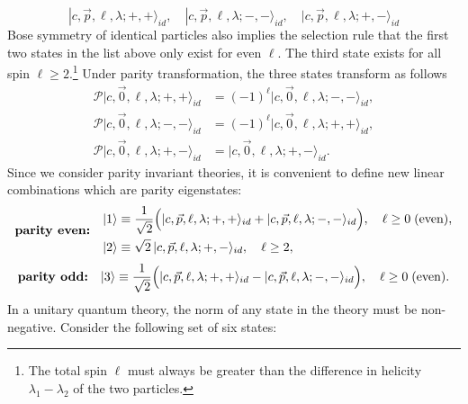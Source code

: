 \begin{equation}
	|c,\vec p, \ell, \lambda; + , + \rangle_{id}, \quad |c,\vec p, \ell, \lambda; - , - \rangle_{id}, \quad |c,\vec p, \ell, \lambda; + , - \rangle_{id}
\end{equation}
Bose symmetry of identical particles also implies the selection rule that the first two states in the list above only exist for even $\ell$. The third state exists for all spin $\ell \geq 2$.\footnote{The total spin $\ell$ must always be greater than the difference in helicity $\lambda_1 - \lambda_2$ of the two particles.} Under parity transformation, the three states transform as follows 
\begin{equation}
	\begin{aligned}
		\mathcal P|c,\vec 0, \ell, \lambda; + , + \rangle_{id} &= (-1)^{\ell} |c,\vec 0, \ell, \lambda; - , - \rangle_{id},\\
		\mathcal P|c,\vec 0, \ell, \lambda; - , - \rangle_{id} &= (-1)^{\ell} |c,\vec 0, \ell, \lambda; + , + \rangle_{id},\\
		\mathcal P|c,\vec 0, \ell, \lambda; + , - \rangle_{id} &=  |c,\vec 0, \ell, \lambda; + , - \rangle_{id}.
	\end{aligned}
	\label{parityOnPartialWaves}
\end{equation}
Since we consider parity invariant theories, it is convenient to define new linear combinations which are parity eigenstates:
\begin{equation}
	\label{eq:parity_even_two_photon_irreps}
	\text{\bf parity even:}\quad
	\begin{aligned}
		|1\rangle &\equiv \frac{1}{\sqrt{2}}\Big(|c,\vec p, \ell, \lambda; + , + \rangle_{id} +  |c,\vec p, \ell, \lambda; - , - \rangle_{id}\Big), \quad \ell \geq 0\;(\text{even}),\\
		|2 \rangle &\equiv  \sqrt{2}\,|c,\vec p, \ell, \lambda; + , - \rangle_{id}, \quad \ell \geq 2,
	\end{aligned}
\end{equation}
\begin{equation}
	\label{eq:parity_odd_two_photon_irrep}
		\text{\bf parity odd:}\quad
	|3\rangle \equiv \frac{1}{\sqrt{2}}\Big(|c,\vec p, \ell, \lambda; + , + \rangle_{id} -  |c,\vec p, \ell, \lambda; - , - \rangle_{id}\Big), \quad \ell \geq 0\; (\text{even}).\\
\end{equation}
In a unitary quantum theory, the norm of any state in the theory must be non-negative. Consider the following set of six states:
